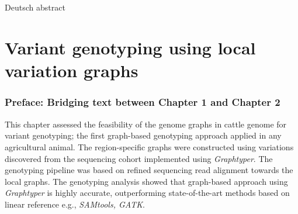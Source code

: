 \documentclass[11 pt, a4paper, notitlepage]{report}
\begin{document}
\newpage

\thispagestyle{plain}
\section*{}

Deutsch abstract

\newpage


\onehalfspacing


\chapter[Feasibility of the bovine genome graphs]{\LARGE{Variant genotyping using local variation graphs}}
\label{chap:locgraph}
\subsection*{Preface: Bridging text between Chapter 1 and Chapter 2}
\onehalfspacing
\normalsize
This chapter assessed the feasibility of the genome graphs in cattle genome for variant genotyping; the first graph-based genotyping approach applied in any agricultural animal. The region-specific graphs were constructed using variations discovered from the sequencing cohort implemented using \emph{Graphtyper}. The genotyping pipeline was based on refined sequencing read alignment towards the local graphs. The genotyping analysis showed that graph-based approach using \textit{Graphtyper} is highly accurate, outperforming state-of-the-art methods based on linear reference e.g., \textit{SAMtools, \emph{GATK}}. \\

\bigskip

\end{document}
